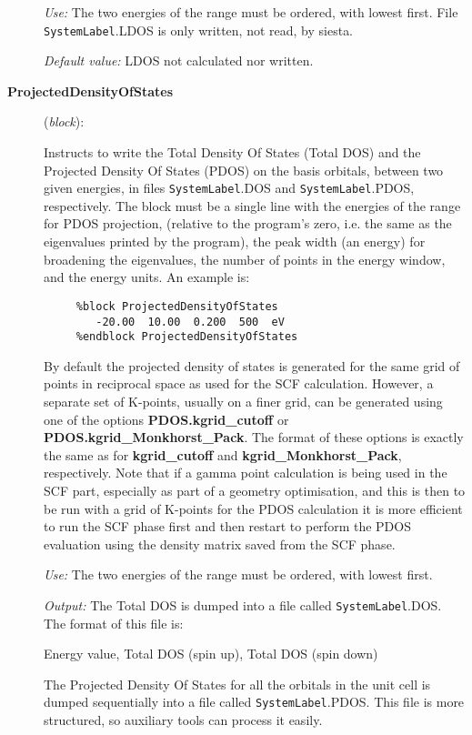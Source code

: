 \documentclass[11pt]{article}
\begin{document}
\begin{description}
{\it Use:} The two energies of the range must be ordered,
with lowest first.
File {\tt SystemLabel}.LDOS is only written, not read, by siesta.

{\it Default value:} LDOS not calculated nor written.
        

\item[{\bf ProjectedDensityOfStates}] ({\it block}):

Instructs to write the Total Density Of States (Total DOS) and the 
Projected Density Of States (PDOS) on the basis orbitals,
between two given energies,
in files {\tt SystemLabel}.DOS and 
{\tt SystemLabel}.PDOS, respectively. 
The block must be a single line with the energies of the range for 
PDOS projection,
(relative to the program's zero, i.e. the same as the eigenvalues
printed by the program), the peak width (an energy) for broadening
the eigenvalues, the number of points in the energy window, 
and the energy units.
An example is:

\begin{verbatim}
     %block ProjectedDensityOfStates
        -20.00  10.00  0.200  500  eV
     %endblock ProjectedDensityOfStates
\end{verbatim}

By default the projected density of states is generated for the same
grid of points in reciprocal space as used for the SCF calculation.
However, a separate set of K-points, usually on a finer grid, can 
be generated using one of the options \textbf{PDOS.kgrid\_cutoff} or
\textbf{PDOS.kgrid\_Monkhorst\_Pack}. The format of these options is
exactly the same as for \textbf{kgrid\_cutoff} and 
\textbf{kgrid\_Monkhorst\_Pack}, respectively. Note that if a gamma
point calculation is being used in the SCF part, especially as part
of a geometry optimisation, and this is then to
be run with a grid of K-points for the PDOS calculation it is more
efficient to run the SCF phase first and then restart to perform the
PDOS evaluation using the density matrix saved from the SCF phase. 

{\it Use:} The two energies of the range must be ordered, with lowest
first. 

{\it Output:} The Total DOS is dumped into a file
called {\tt SystemLabel}.DOS. The format of this file is:

Energy value, Total DOS (spin up), Total DOS (spin down)

The Projected Density Of States for all the orbitals in the unit cell
is dumped sequentially into a file called {\tt SystemLabel}.PDOS. This
file is more structured, so auxiliary tools can process it easily.


\end{description}
\end{document}
